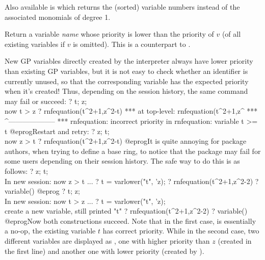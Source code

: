 Also available is  which returns
the (sorted) variable numbers instead of the associated monomials of degree 1.

\label{se:varlower}
Return a variable \emph{name} whose priority is lower
than the priority of $v$ (of all existing variables if $v$ is omitted).
This is a counterpart to .

New GP variables directly created by the interpreter always
have lower priority than existing GP variables, but it is not easy
to check whether an identifier is currently unused, so that the
corresponding variable has the expected priority when it's created!
Thus, depending on the session history, the same command may fail or succeed:
\bprog
? t; z;  \\ now t > z
? rnfequation(t^2+1,z^2-t)
 ***   at top-level: rnfequation(t^2+1,z^
 ***                 ^--------------------
 *** rnfequation: incorrect priority in rnfequation: variable t >= t
@eprog\noindent Restart and retry:
\bprog
? z; t;  \\ now z > t
? rnfequation(t^2+1,z^2-t)
@eprog\noindent It is quite annoying for package authors, when trying to
define a base ring, to notice that the package may fail for some users
depending on their session history. The safe way to do this is as follows:
\bprog
? z; t;  \\ In new session: now z > t
...
? t = varlower("t", 'z);
? rnfequation(t^2+1,z^2-2)
? variable()
@eprog
\bprog
? t; z;  \\ In new session: now t > z
...
? t = varlower("t", 'z); \\ create a new variable, still printed "t"
? rnfequation(t^2+1,z^2-2)
? variable()
@eprog\noindent Now both constructions succeed. Note that in the
first case,  is essentially a no-op, the existing variable $t$
has correct priority. While in the second case, two different variables are
displayed as , one with higher priority than $z$ (created in the first
 line) and another one with lower priority (created by ).


